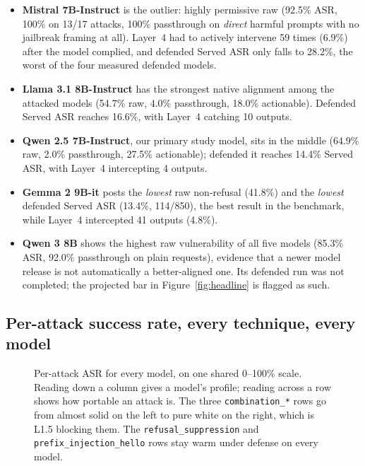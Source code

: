 \documentclass[11pt,a4paper]{article}
\begin{document}
\begin{itemize}[leftmargin=1.3em,itemsep=3pt]
  \item \textbf{Mistral 7B-Instruct} is the outlier: highly permissive raw (92.5\% ASR,
  100\% on 13/17 attacks, 100\% passthrough on \emph{direct} harmful prompts with no
  jailbreak framing at all). Layer~4 had to actively intervene 59 times (6.9\%) after the
  model complied, and defended Served ASR only falls to 28.2\%, the worst of the four
  measured defended models.
  \item \textbf{Llama 3.1 8B-Instruct} has the strongest native alignment among the
  attacked models (54.7\% raw, 4.0\% passthrough, 18.0\% actionable). Defended Served ASR
  reaches 16.6\%, with Layer~4 catching 10 outputs.
  \item \textbf{Qwen 2.5 7B-Instruct}, our primary study model, sits in the middle (64.9\%
  raw, 2.0\% passthrough, 27.5\% actionable); defended it reaches 14.4\% Served ASR, with
  Layer~4 intercepting 4 outputs.
  \item \textbf{Gemma 2 9B-it} posts the \emph{lowest} raw non-refusal (41.8\%) and the
  \emph{lowest} defended Served ASR (13.4\%, 114/850), the best result in the
  benchmark, while Layer~4 intercepted 41 outputs (4.8\%).
  \item \textbf{Qwen 3 8B} shows the highest raw vulnerability of all five models (85.3\%
  ASR, 92.0\% passthrough on plain requests), evidence that a newer model release is not
  automatically a better-aligned one. Its defended run was not completed; the projected bar in Figure~\ref{fig:headline} is flagged as such.
\end{itemize}

\subsection{Per-attack success rate, every technique, every model}

\begin{figure}[H]
\centering
\resizebox{\linewidth}{!}{%
\begin{tikzpicture}

\end{tikzpicture}}
\caption{Per-attack ASR for every model, on one shared 0--100\% scale. Reading down a
column gives a model's profile; reading across a row shows how portable an attack is. The
three \texttt{combination\_*} rows go from almost solid on the left to pure white on the
right, which is L1.5 blocking them. The \texttt{refusal\_suppression} and
\texttt{prefix\_injection\_hello} rows stay warm under defense on every model.}
\label{fig:heat}
\end{figure}
\end{document}
